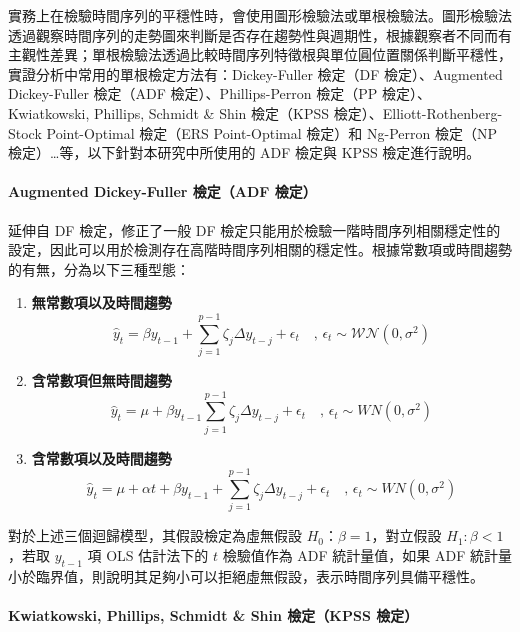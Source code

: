 實務上在檢驗時間序列的平穩性時，會使用圖形檢驗法或單根檢驗法。圖形檢驗法透過觀察時間序列的走勢圖來判斷是否存在趨勢性與週期性，根據觀察者不同而有主觀性差異；單根檢驗法透過比較時間序列特徵根與單位圓位置關係判斷平穩性，實證分析中常用的單根檢定方法有：Dickey-Fuller 檢定（DF 檢定）、Augmented Dickey-Fuller 檢定（ADF 檢定）、Phillips-Perron 檢定（PP 檢定）、Kwiatkowski, Phillips, Schmidt \& Shin 檢定（KPSS 檢定）、Elliott-Rothenberg-Stock Point-Optimal 檢定（ERS Point-Optimal 檢定）和 Ng-Perron 檢定（NP 檢定）…等，以下針對本研究中所使用的 ADF 檢定與 KPSS 檢定進行說明。

\paragraph{Augmented Dickey-Fuller 檢定（ADF 檢定）} 

延伸自 DF 檢定，修正了一般 DF 檢定只能用於檢驗一階時間序列相關穩定性的設定，因此可以用於檢測存在高階時間序列相關的穩定性。根據常數項或時間趨勢的有無，分為以下三種型態：

\begin{enumerate}
  \item \textbf{無常數項以及時間趨勢}
    \begin{equation}
      \hat{y}_{t} = \beta y_{t - 1} + \sum_{j = 1}^{p - 1} \zeta_{j} \Delta y_{t - j} + \epsilon_{t} \quad \text{, } \epsilon_{t} \sim \mathcal{WN}(0, \sigma^2)
    \end{equation}
  \item \textbf{含常數項但無時間趨勢}
    \begin{equation}
      \hat{y}_{t} = \mu + \beta y_{t - 1} \sum_{j = 1}^{p - 1} \zeta_{j} \Delta y_{t - j} + \epsilon_{t} \quad \text{, } \epsilon_{t} \sim WN(0, \sigma^2)
    \end{equation}
  \item \textbf{含常數項以及時間趨勢}
    \begin{equation}
      \hat{y}_{t} = \mu + \alpha t + \beta y_{t - 1} + \sum_{j = 1}^{p - 1} \zeta_{j} \Delta y_{t - j} + \epsilon_{t} \quad \text{, } \epsilon_{t} \sim WN(0, \sigma^2)
    \end{equation}
\end{enumerate}

對於上述三個迴歸模型，其假設檢定為虛無假設 $H_0$：$\beta = 1$，對立假設 $H_1: \beta < 1$，若取 $y_{t-1}$ 項 OLS 估計法下的 $t$ 檢驗值作為 ADF 統計量值，如果 ADF 統計量小於臨界值，則說明其足夠小可以拒絕虛無假設，表示時間序列具備平穩性。

\paragraph{Kwiatkowski, Phillips, Schmidt \& Shin 檢定（KPSS 檢定）} 

